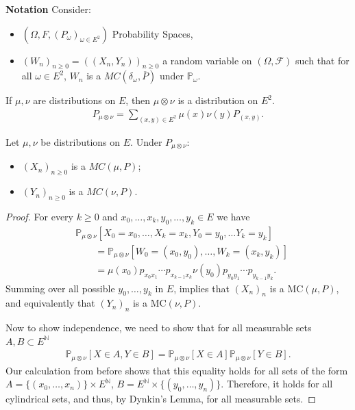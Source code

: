 \noindent
\textbf{Notation} Consider:
\begin{itemize}
	\item $(\Omega, F, (P_\omega)_{\omega \in E^2})$ Probability Spaces,
	\item $(W_n)_{n\geq 0}=((X_n,Y_n))_{n\geq 0}$ a random variable on $(\Omega, \mathcal{F})$ such that for all $\omega \in E^2$, $W_n$ is a $MC(\delta_\omega, \overline{P})$ under $\mathbb{P}_{\omega}$.
\end{itemize}

\begin{rmk}[]
	If $\mu, \nu $ are distributions on $E$, then $\mu \otimes \nu $ is a distribution on $E^2$.
	\begin{align}
		\boxed{P_{\mu \otimes \nu }= \sum_{(x,y)\in E^2}^{}\mu (x) \nu (y) P_{(x,y)}}.
	\end{align}
	
\end{rmk}

\begin{prop}[]
	Let $\mu,\nu $ be distributions on $E$. Under $P_{\mu \otimes \nu }:$ 
\begin{itemize}
	\item $(X_n)_{n\geq 0}$ is a $MC(\mu ,P)$;
	\item $(Y_n)_{n\geq 0}$ is a $MC(\nu ,P)$.
\end{itemize}
\end{prop}
\begin{proof}
	For every $k\geq 0$ and $x_0,\ldots,x_k, y_0, \ldots, y_k \in E$ we have
\begin{align}
&	\mathbb{P}_{\mu \otimes \nu } \left[ X_0 = x_0, \ldots, X_k=x_k, Y_0 = y_0, \ldots Y_k = y_k \right] \\
&\qquad= \mathbb{P}_{\mu \otimes \nu } \left[ W_0=(x_0, y_0), \ldots, W_k = (x_k, y_k) \right] \\
&\qquad= \mu (x_0) p_{x_0x_1}\cdots p_{x_{k-1}x_k} \nu (y_0) p_{y_0 y_1} \cdots p_{y_{k-1}y_k}
.	\end{align}
Summing over all possible $y_0,\ldots , y_k$ in $E$, implies that $(X_n)_{n}$ is a MC$(\mu ,P)$, and equivalently that $(Y_n)_{n}$ is a MC$(\nu ,P)$.	

Now to show independence, we need to show that for all measurable sets $A,B \subset E^{\mathbb{N}}$ 
\begin{align}
	\mathbb{P}_{\mu \otimes \nu } \left[ X \in A, Y\in B \right] = \mathbb{P}_{\mu \otimes \nu } \left[ X \in A \right] \mathbb{P}_{\mu \otimes \nu } \left[ Y \in B \right].
\end{align}
Our calculation from before shows that this equality holds for all sets of the form $A = \{(x_0,\ldots,x_n)\} \times E^{\mathbb{N}}$, $B=E^{\mathbb{N}}\times \{(y_0,\ldots , y_n)\}$. Therefore, it holds for all cylindrical sets, and thus, by Dynkin's Lemma, for all measurable sets.
\end{proof}

